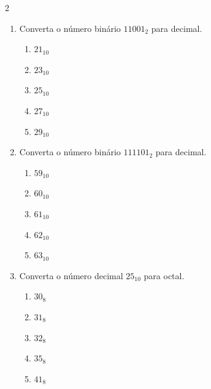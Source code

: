 \documentclass[a4paper,12pt]{article}
\begin{document}
\begin{multicols}{2}
\begin{enumerate}[leftmargin=*]
\begin{enumerate}[label=(\Alph*)]
    \item $8_{10}$
    \item $10_{10}$
    \item $12_{10}$
    \item $14_{10}$
    \item $16_{10}$
\end{enumerate}

\vspace{0.2cm}

\item Converta o número binário $11001_2$ para decimal.

\begin{enumerate}[label=(\Alph*)]
    \item $21_{10}$
    \item $23_{10}$
    \item $25_{10}$
    \item $27_{10}$
    \item $29_{10}$
\end{enumerate}

\vspace{0.2cm}

\item Converta o número binário $111101_2$ para decimal.

\begin{enumerate}[label=(\Alph*)]
    \item $59_{10}$
    \item $60_{10}$
    \item $61_{10}$
    \item $62_{10}$
    \item $63_{10}$
\end{enumerate}

\vspace{0.2cm}


\item Converta o número decimal $25_{10}$ para octal.

\begin{enumerate}[label=(\Alph*)]
    \item $30_8$
    \item $31_8$
    \item $32_8$
    \item $35_8$
    \item $41_8$
\end{enumerate}


\end{enumerate}
\end{multicols}
\end{document}
